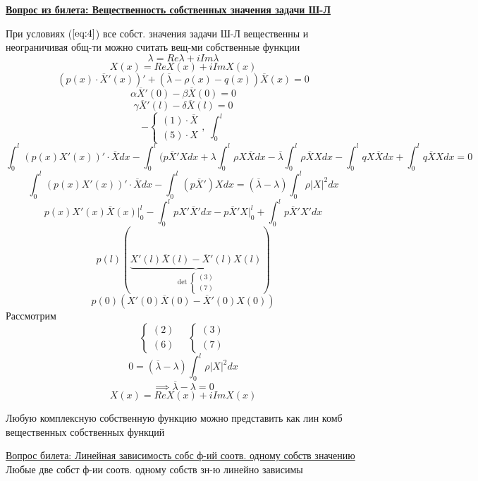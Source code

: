 \documentclass[a4paper]{article}
\begin{document}
\underline{\textbf{Вопрос из билета: Вещественность собственных значения задачи Ш-Л}}

При условиях ($ \ref{eq:4} $) все собст. значения задачи Ш-Л вещественны и неограничивая общ-ти
можно считать вещ-ми собственные функции
\[
    \lambda = Re\lambda + i Im \lambda
\]
\[
    X(x) = Re X(x) + i Im X(x)
\]
\begin{equation}
    (p(x) \cdot \overline{X}'(x))' + (\overline{\lambda} - \rho(x) - q(x)) 
    \overline{X}(x) = 0
\end{equation}
\begin{equation}
    \alpha \overline{X}'(0) - \beta \overline{X}(0) = 0
\end{equation}
\begin{equation}
    \gamma \overline{X}'(l) - \delta \overline{X}(l) = 0
\end{equation}
\[
    -
    \begin{cases}
        (1) \cdot \overline{X}\\
        (5) \cdot X
    \end{cases}
    , \ \int_{0}^{l} 
\]
\[
    \int_{0}^{l} (p(x) X'(x))' \cdot \overline{X} dx - \int_{0}^{l} (p \overline{X}'
    Xdx + \lambda \int_{0}^{l} \rho X \overline{X} dx - \overline{\lambda}
    \int_{0}^{l} \rho \overline{X} X dx - \int_{0}^{l} q X \overline{X} dx +
    \int_{0}^{l} q \overline{X} X dx = 0
\]
\[
    \int_{0}^{l} (p(x) X'(x))' \cdot \overline{X} dx - \int_{0}^{l} 
    (p \overline{X}') X dx = (\overline{\lambda}- \lambda) \int_{0}^{l} \rho |X|^2 dx
\]
\[
    p(x)X'(x) \overline{X}(x) \big|_{0}^{l} - \int_{0}^{l} p X' \overline{X}'dx
    - p \overline{X}' X \big|_{0}^{l} + \int_{0}^{l} p \overline{X}' X' dx
\]
\[
    p(l) (\underbrace{X'(l) \overline{X}(l) - \overline{X}'(l) X(l)}_{\det \begin{cases}
            (3)\\
            (7)
    \end{cases}})
\]
\[
    p(0) (X'(0) \overline{X}(0) - \overline{X}'(0) X(0))
\]
Рассмотрим
\[
    \begin{cases}
        (2)\\
        (6)
    \end{cases}
    \quad
    \begin{cases}
        (3)\\
        (7)
    \end{cases}
\]
\[
    0 = (\overline{\lambda} - \lambda) \int_{0}^{l} \rho |X|^2 dx 
\]
\[
    \implies \overline{\lambda} - \lambda = 0
\]
\[
    X(x) = Re X(x) + i Im X(x)
\]

Любую комплексную собственную функцию можно представить как лин комб вещественных
собственных функций

\underline{Вопрос билета: Линейная зависимость собс ф-ий соотв. одному собств значению}\\
Любые две собст ф-ии соотв. одному собств зн-ю линейно зависимы
\end{document}
